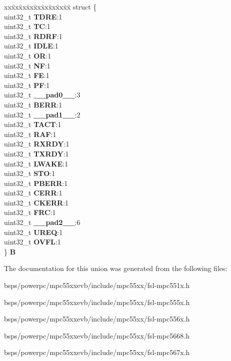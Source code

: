 \begin{DoxyCompactItemize}
\begin{tabbing}
\end{tabbing}\item 
\mbox{\label{unionESCI__tag_1_1ESCI__SR__tag_a802bd5a2eaca842f76f6d0db402d092b}} 
\begin{tabbing}
xx\=xx\=xx\=xx\=xx\=xx\=xx\=xx\=xx\=\kill
struct \{\\
\>uint32\_t {\bfseries TDRE}:1\\
\>uint32\_t {\bfseries TC}:1\\
\>uint32\_t {\bfseries RDRF}:1\\
\>uint32\_t {\bfseries IDLE}:1\\
\>uint32\_t {\bfseries OR}:1\\
\>uint32\_t {\bfseries NF}:1\\
\>uint32\_t {\bfseries FE}:1\\
\>uint32\_t {\bfseries PF}:1\\
\>uint32\_t {\bfseries \_\_pad0\_\_}:3\\
\>uint32\_t {\bfseries BERR}:1\\
\>uint32\_t {\bfseries \_\_pad1\_\_}:2\\
\>uint32\_t {\bfseries TACT}:1\\
\>uint32\_t {\bfseries RAF}:1\\
\>uint32\_t {\bfseries RXRDY}:1\\
\>uint32\_t {\bfseries TXRDY}:1\\
\>uint32\_t {\bfseries LWAKE}:1\\
\>uint32\_t {\bfseries STO}:1\\
\>uint32\_t {\bfseries PBERR}:1\\
\>uint32\_t {\bfseries CERR}:1\\
\>uint32\_t {\bfseries CKERR}:1\\
\>uint32\_t {\bfseries FRC}:1\\
\>uint32\_t {\bfseries \_\_pad2\_\_}:6\\
\>uint32\_t {\bfseries UREQ}:1\\
\>uint32\_t {\bfseries OVFL}:1\\
\} {\bfseries B}\\

\end{tabbing}\end{DoxyCompactItemize}


The documentation for this union was generated from the following files\+:\begin{DoxyCompactItemize}
\item 
bsps/powerpc/mpc55xxevb/include/mpc55xx/fsl-\/mpc551x.\+h\item 
bsps/powerpc/mpc55xxevb/include/mpc55xx/fsl-\/mpc555x.\+h\item 
bsps/powerpc/mpc55xxevb/include/mpc55xx/fsl-\/mpc556x.\+h\item 
bsps/powerpc/mpc55xxevb/include/mpc55xx/fsl-\/mpc5668.\+h\item 
bsps/powerpc/mpc55xxevb/include/mpc55xx/fsl-\/mpc567x.\+h\end{DoxyCompactItemize}
